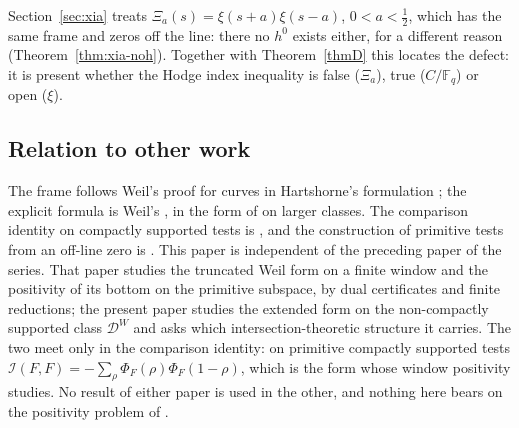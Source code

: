 \documentclass[11pt]{amsart}
\theoremstyle{definition}
\theoremstyle{remark}
\newcommand{\F}{\mathbb F}
\newcommand{\DW}{\mathcal D^{W}}
\newcommand{\I}{\mathcal I}
\begin{document}
Section~\ref{sec:xia} treats $\Xi_a(s)=\xi(s+a)\xi(s-a)$, $0<a<\frac12$, which has the same frame
and zeros off the line: there no $h^0$ exists either, for a different reason
(Theorem~\ref{thm:xia-noh}). Together with Theorem~\ref{thmD} this locates the defect: it is present
whether the Hodge index inequality is false ($\Xi_a$), true ($C/\F_q$) or open ($\xi$).

\subsection{Relation to other work}
The frame follows Weil's proof for curves \cite{Weil48} in Hartshorne's formulation \cite{Hartshorne};
the explicit formula is Weil's \cite{Weil52}, in the form of \cite{Barner1981} on larger classes.
The comparison identity on compactly supported tests is \cite[Thm.~4.1]{Paper45}, and the
construction of primitive tests from an off-line zero is \cite[Thm.~6.2]{Paper45}. This paper is
independent of the preceding paper \cite{Paper46} of the series. That paper studies the truncated Weil form on a finite window and
the positivity of its bottom on the primitive subspace, by dual certificates and finite reductions;
the present paper studies the extended form on the non-compactly supported class $\DW$ and asks
which intersection-theoretic structure it carries. The two meet only in the comparison identity:
on primitive compactly supported tests $\I(F,F)=-\sum_\rho\Phi_F(\rho)\Phi_F(1-\rho)$, which is the
form whose window positivity \cite{Paper46} studies. No result of either paper is used in the other,
and nothing here bears on the positivity problem of \cite{Paper46}.
\end{document}
